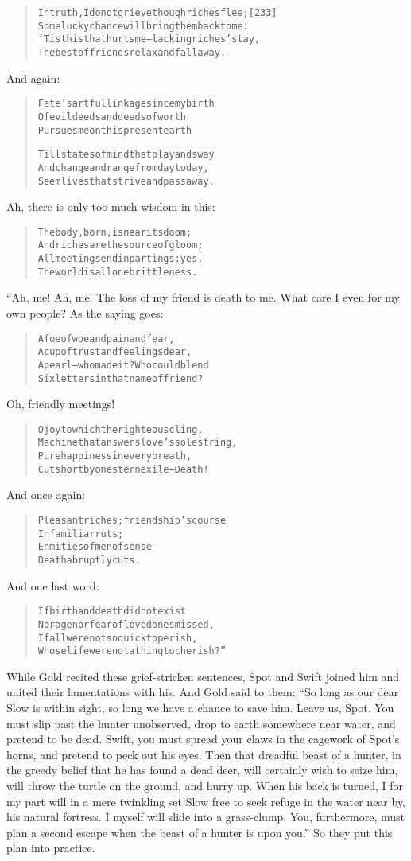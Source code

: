 \documentclass[article, twoside, 14pt]{memoir}
\renewenvironment{verbatim}{%
\begin{quote}%
\vskip -10pt%
\begin{alltt}\normalfont\large}{\end{alltt}%
\end{quote}%
\vskip -10pt
} %
\begin{document}
\begin{verbatim}
In truth, I do not grieve though riches flee;           [233]
Some lucky chance will bring them back to me:
'Tis this that hurts me--lacking riches' stay,
The best of friends relax and fall away.
\end{verbatim}
And again:

\begin{verbatim}
Fate's artful linkage since my birth
Of evil deeds and deeds of worth
Pursues me on this present earth

Till states of mind that play and sway
And change and range from day to day,
Seem lives that strive and pass away.
\end{verbatim}
Ah, there is only too much wisdom in this:

\begin{verbatim}
The body, born, is near its doom;
And riches are the source of gloom;
All meetings end in partings: yes,
The world is all one brittleness.
\end{verbatim}
“Ah, me! Ah, me! The loss of my friend is death to me. What care I
even for my own people? As the saying goes:

\begin{verbatim}
A foe of woe and pain and fear,
A cup of trust and feelings dear,
A pearl--who made it? Who could blend
Six letters in that name of friend?
\end{verbatim}
Oh, friendly meetings!

\begin{verbatim}
O joy to which the righteous cling,
Machine that answers love's sole string,
Pure happiness in every breath,
Cut short by one stern exile--Death!
\end{verbatim}
And once again:

\begin{verbatim}
Pleasant riches; friendship's course
    In familiar ruts;
Enmities of men of sense--
    Death abruptly cuts.
\end{verbatim}
And one last word:

\begin{verbatim}
If birth and death did not exist
Nor age nor fear of loved ones missed,
If all were not so quick to perish,
Whose life were not a thing to cherish?”
\end{verbatim}
While Gold recited these grief-stricken sentences, Spot and Swift
joined him and united their lamentations with his. And Gold said to
them:
``So long as our dear Slow is within sight, so long we have a chance to save him. Leave us, Spot. You must slip past the hunter unobserved, drop to earth somewhere near water, and pretend to be dead. Swift, you must spread your claws in the cagework of Spot's horns, and pretend to peck out his eyes. Then that dreadful beast of a hunter, in the greedy belief that he has found a dead deer, will certainly wish to seize him, will throw the turtle on the ground, and hurry up. When his back is turned, I for my part will in a mere twinkling set Slow free to seek refuge in the water near by, his natural fortress. I myself will slide into a grass-clump. You, furthermore, must plan a second escape when the beast of a hunter is upon you.''
So they put this plan into practice.
\end{document}
